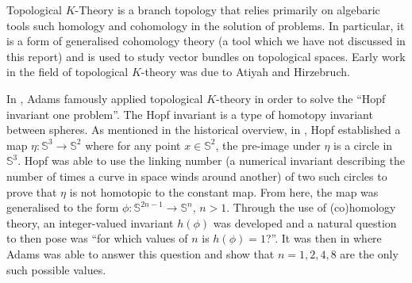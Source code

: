 \documentclass[12pt,a4paper]{article}
\numberwithin{equation}{section}
\theoremstyle{definition}
\theoremstyle{remark}
\begin{document}

Topological $K$-Theory is a branch topology that relies primarily on algebaric tools such homology and cohomology in the solution of problems. In particular, it is a form of generalised cohomology theory (a tool which we have not discussed in this report) and is used to study vector bundles on topological spaces. Early work in the field of topological $K$-theory was due to Atiyah and Hirzebruch. 

In \cite{MR0141119}, Adams famously applied topological $K$-theory in order to solve the ``Hopf invariant one problem''. The Hopf invariant is a type of homotopy invariant between spheres. As mentioned in the historical overview, in \cite{MR1512691}, Hopf established a map $\eta:\mathbb{S}^3\to\mathbb{S}^2$ where for any point $x\in\mathbb{S}^2$, the pre-image under $\eta$ is a circle in $\mathbb{S}^3$. Hopf was able to use the linking number (a numerical invariant describing the number of times a curve in space winds around another) of two such circles to prove that $\eta$ is not homotopic to the constant map. From here, the map was generalised to the form $\phi:\mathbb{S}^{2n-1}\to\mathbb{S}^n$, $n>1$. Through the use of (co)homology theory, an integer-valued invariant $h(\phi)$ was developed and a natural question to then pose was ``for which values of $n$ is $h(\phi)=1$?''. It was then in \cite{MR0141119} where Adams was able to answer this question and show that $n=1,2,4,8$ are the only such possible values.
\end{document}
